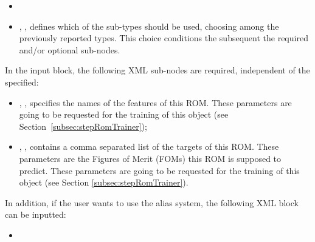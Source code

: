 %
\attrsIntro
%
\vspace{-5mm}
\begin{itemize}
  \itemsep0em
  \item \nameDescription
  \item {}, , defines which of
  the sub-types should be used, choosing among the previously reported
  types.
  This choice conditions the subsequent the required and/or optional
   sub-nodes.
\end{itemize}
\vspace{-5mm}

In the  input block, the following XML sub-nodes are required,
independent of the  specified:
%
\begin{itemize}
   \item {}, , specifies the names of the features of this ROM.
   \nb These parameters are going to be requested for the training of this object (see Section~\ref{subsec:stepRomTrainer});
    \item {}, , contains a comma separated list of the targets of this ROM. These parameters are the Figures of Merit (FOMs) this ROM is supposed to predict.
    \nb These parameters are going to be requested for the training of this
    object (see Section \ref{subsec:stepRomTrainer}).

\end{itemize}

In addition, if the user wants to use the alias system, the following XML block can be inputted:
\begin{itemize}
  \item {}
\end{itemize}


